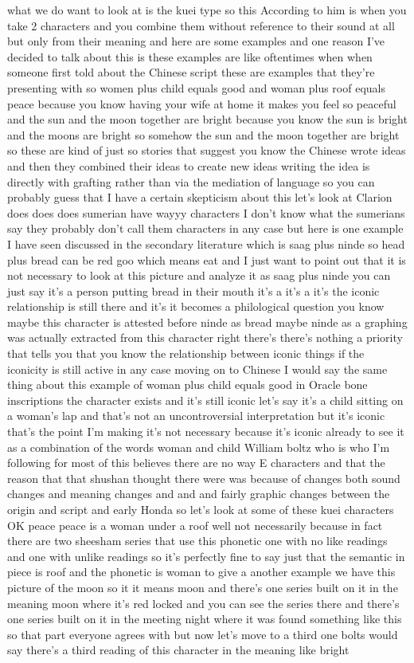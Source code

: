 what we do want to look at is the kuei type so this According to him is when you take 2 characters and you combine them without reference to their sound at all but only from their meaning and here are some examples and one reason I've decided to talk about this is these examples are like oftentimes when when someone first told about the Chinese script these are examples that they're presenting with so women plus child equals good and woman plus roof equals peace because you know having your wife at home it makes you feel so peaceful  and the sun and the moon together are bright because you know the sun is bright and the moons are bright so somehow the sun and the moon together are bright so these are kind of just so stories that suggest you know the Chinese wrote ideas and then they combined their ideas to create new ideas writing the idea is directly with grafting rather than via the mediation of language so you can probably guess that I have a certain skepticism about this let's look at Clarion does does does sumerian have wayyy characters I don't know what the sumerians say they probably don't call them characters in any case but here is one example I have seen discussed in the secondary literature which is saag plus ninde so head plus bread can be red goo which means eat and I just want to point out that it is not necessary to look at this picture and analyze it as saag plus ninde you can just say it's a person putting bread in their mouth it's a it's a it's the iconic relationship is still there and it's it becomes a philological question you know maybe this character is attested before ninde as bread maybe ninde as a graphing was actually extracted from this character right there's there's nothing a priority that tells you that you know the relationship between iconic things if the iconicity is still active in any case moving on to Chinese I would say the same thing about this example of woman plus child equals good in Oracle bone inscriptions the character exists and it's still iconic let's say it's a child sitting on a woman's lap and that's not an uncontroversial interpretation but it's iconic that's the point I'm making it's not necessary because it's iconic already to see it as a combination of the words woman and child William boltz who is who I'm following for most of this believes there are no way E characters and that the reason that that shushan thought there were was because of changes both sound changes and meaning changes and and and fairly graphic changes between the origin and script and early Honda so let's look at some of these kuei characters OK peace peace is a woman under a roof well not necessarily because in fact there are two sheesham series that use this phonetic one with no like readings and one with unlike readings so it's perfectly fine to say just that the semantic in piece is roof and the phonetic is woman to give a another example we have this picture of the moon so it it means moon  and there's one series built on it in the meaning moon where it's red locked and you can see the series there and there's one series built on it in the meeting night where it was found something like this so that part everyone agrees with but now let's move to a third one bolts would say there's a third reading of this character in the meaning like bright 